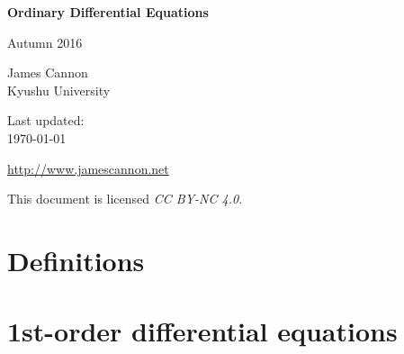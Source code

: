 \documentclass[a4paper]{book} %
\begin{document}
\begin{titlepage}
    \begin{center}
        \vspace*{1cm}
        
        \Huge
        \textbf{Ordinary Differential Equations}

        Autumn 2016
        
        \vspace{2.0cm}
        \LARGE
        James Cannon\\Kyushu University
        
        \vspace{1.5cm}
        \Large
        Last updated:\\\today

        \vfill
        
        \url{http://www.jamescannon.net}
        \vspace{1.5cm}

        \small
        This document is licensed \emph{CC BY-NC 4.0}.
        
    \end{center}
\end{titlepage}





\newpage
\tableofcontents


\chapter{Definitions}

\chapter{1st-order differential equations}

\end{document}
